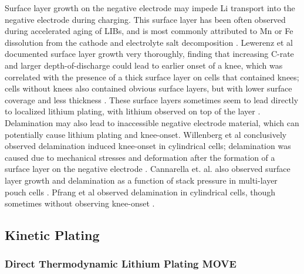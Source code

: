 \documentclass{article}
\newcommand{\pbox}[1]{{
\fbox{
\parbox{0.8\textwidth}{  \fbox{$\triangleright$\textcolor{blue}{\textbf{From Peter}:}} 
#1
}}}}
\begin{document}
Surface layer growth on the negative electrode may impede Li transport into the negative electrode during charging. This surface layer has been often observed during accelerated aging of LIBs, and is most commonly attributed to Mn or Fe dissolution from the cathode and electrolyte salt decomposition \cite{lewerenz_post-mortem_2017,lewerenz_systematic_2017,zhu_investigation_2021,stiaszny_electrochemical_2014,rahe_nanoscale_2019,keil_linear_2019,sarasketa-zabala_understanding_2015, willenberg_high-precision_2020}. Lewerenz et al documented surface layer growth very thoroughly, finding that increasing C-rate and larger depth-of-discharge could lead to earlier onset of a knee, which was correlated with the presence of a thick surface layer on cells that contained knees; cells without knees also contained obvious surface layers, but with lower surface coverage and less thickness \cite{lewerenz_post-mortem_2017,lewerenz_systematic_2017}. These surface layers sometimes seem to lead directly to localized lithium plating, with lithium observed on top of the layer \cite{zhu_investigation_2021}. Delamination may also lead to inaccessible negative electrode material, which can potentially cause lithium plating and knee-onset. Willenberg et al conclusively observed delamination induced knee-onset in cylindrical cells; delamination was caused due to mechanical stresses and deformation after the formation of a surface layer on the negative electrode \cite{willenberg_high-precision_2020}. Cannarella et. al. also observed surface layer growth and delamination as a function of stack pressure in multi-layer pouch cells \cite{cannarella_stress_2014}. Pfrang et al observed delamination in cylindrical cells, though sometimes without observing knee-onset \cite{pfrang_long-term_2018}.

\subsection{Kinetic Plating}

\subsubsection{Direct Thermodynamic Lithium Plating MOVE}

\pbox{READY FOR EDITING}
\end{document}
